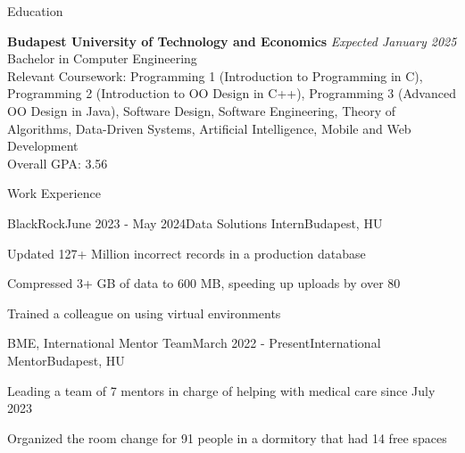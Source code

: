 \documentclass[
	a4paper, %
	11pt, %
]{resume} %
\begin{document}

\begin{rSection}{Education}
	
	\textbf{Budapest University of Technology and Economics} \hfill \textit{Expected January 2025} \\ 
	Bachelor in Computer Engineering \\
	Relevant Coursework: Programming 1 (Introduction to Programming in C), Programming 2 (Introduction to OO Design in C++), Programming 3 (Advanced OO Design in Java), Software Design, Software Engineering, Theory of Algorithms, Data-Driven Systems, Artificial Intelligence, Mobile and Web Development \\
	Overall GPA: 3.56
	
\end{rSection}


\begin{rSection}{Work Experience}

	\begin{rSubsection}{BlackRock}{June 2023 - May 2024}{Data Solutions Intern}{Budapest, HU}
		\item Updated 127+ Million incorrect records in a production database
		\item Compressed 3+ GB of data to 600 MB, speeding up uploads by over 80%
		\item Trained a colleague on using virtual environments
	\end{rSubsection}


	\begin{rSubsection}{BME, International Mentor Team}{March 2022 - Present}{International Mentor}{Budapest, HU}
		\item Leading a team of 7 mentors in charge of helping with medical care since July 2023
		\item Organized the room change for 91 people in a dormitory that had 14 free spaces
	\end{rSubsection}

\end{rSection}
\end{document}
